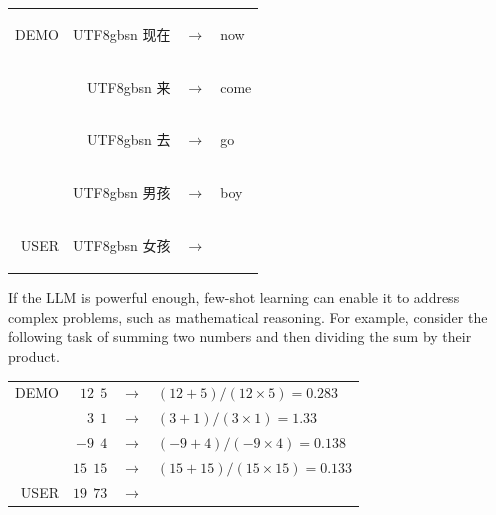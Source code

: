 \vspace{0.5em}
\begin{tcolorbox}

\begingroup
\renewcommand{\arraystretch}{1.0}
\setlength{\tabcolsep}{6pt}
\begin{tabular}{r r c l}
\hspace{0.5em} {\color{gray} \footnotesize{DEMO}} & \begin{CJK*}{UTF8}{gbsn} 现在 \end{CJK*} & $\to$ & now \\
& \begin{CJK*}{UTF8}{gbsn} 来 \end{CJK*} & $\to$ & come\\
& \begin{CJK*}{UTF8}{gbsn} 去 \end{CJK*} & $\to$ & go\\
& \begin{CJK*}{UTF8}{gbsn} 男孩 \end{CJK*} & $\to$ & boy\\
{\color{gray} \footnotesize{USER}} & \begin{CJK*}{UTF8}{gbsn} 女孩 \end{CJK*} & $\to$ & \underline{\hspace{2em}}\\
\end{tabular}
\endgroup

\end{tcolorbox}
\vspace{0.5em}

If the LLM is powerful enough, few-shot learning can enable it to address complex problems, such as mathematical reasoning. For example, consider the following task of summing two numbers and then dividing the sum by their product.

\vspace{0.5em}
\begin{tcolorbox}

\begingroup
\renewcommand{\arraystretch}{1.0}
\setlength{\tabcolsep}{6pt}
\begin{tabular}{r r c l}
\hspace{0.5em} {\color{gray} \footnotesize{DEMO}} & $12\ \ 5$ & $\to$ & $(12 + 5)/(12 \times 5) = 0.283$ \\
& $3\ \ 1$ & $\to$ & $(3 + 1)/(3 \times 1) = 1.33$ \\
& $-9\ \ 4$ & $\to$ & $(-9 + 4)/(-9 \times 4) = 0.138$ \\
& $15\ \ 15$ & $\to$ & $(15 + 15)/(15 \times 15) = 0.133$ \\
{\color{gray} \footnotesize{USER}} & $19\ \ 73$ & $\to$ & \underline{\hspace{2em}}\\
\end{tabular}
\endgroup

\end{tcolorbox}
\vspace{0.5em}

